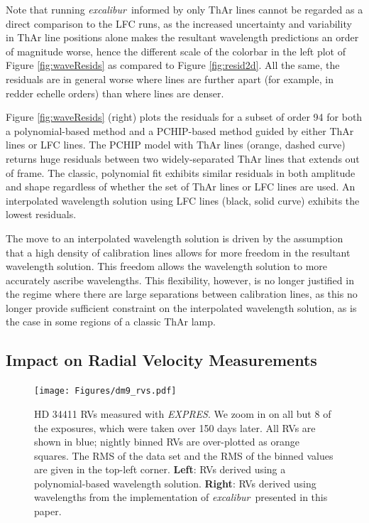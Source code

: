 \documentclass[twocolumn,table,xcolor,trackchanges]{aastex63}
\newcommand{\project}[1]{\textsl{#1}}
\newcommand{\name}{\project{excalibur}}
\newcommand{\acronym}[1]{{\small{#1}}}
\newcommand{\expres}{\project{\acronym{EXPRES}}}
\begin{document}
Note that running \name\ informed by only ThAr lines cannot be regarded as a direct comparison to the LFC runs, as the increased uncertainty and variability in ThAr line positions alone makes the resultant wavelength predictions an order of magnitude worse, hence the different scale of the colorbar in the left plot of Figure \ref{fig:waveResids} as compared to Figure \ref{fig:resid2d}.  All the same, the residuals are in general worse where lines are further apart (for example, in redder echelle orders) than where lines are denser.

Figure \ref{fig:waveResids} (right) plots the residuals for a subset of order 94 for both a polynomial-based method and a PCHIP-based method guided by either ThAr lines or LFC lines.   The PCHIP model with ThAr lines (orange, dashed curve) returns huge residuals between two widely-separated ThAr lines that extends out of frame.  The classic, polynomial fit exhibits similar residuals in both amplitude and shape regardless of whether the set of ThAr lines or LFC lines are used.  An interpolated wavelength solution using LFC lines (black, solid curve) exhibits the lowest residuals.

The move to an interpolated wavelength solution is driven by the assumption that a high density of calibration lines allows for more freedom in the resultant wavelength solution.  This freedom allows the wavelength solution to more accurately ascribe wavelengths.  This flexibility, however, is no longer justified in the regime where there are large separations between calibration lines, as this no longer provide sufficient constraint on the interpolated wavelength solution, as is the case in some regions of a classic ThAr lamp.

\subsection{Impact on Radial Velocity Measurements}\label{sec:test-rv}

\begin{figure}[t]
\centering
\texttt{[image: Figures/dm9\_rvs.pdf]}
\caption{HD 34411 RVs measured with \expres.  We zoom in on all but 8 of the exposures, which were taken over 150 days later.  All RVs are shown in blue; nightly binned RVs are over-plotted as orange squares.  The RMS of the data set and the RMS of the binned values are given in the top-left corner.  \textbf{Left}: RVs derived using a polynomial-based wavelength solution.  \textbf{Right}: RVs derived using wavelengths from the implementation of \name\ presented in this paper.}
\label{fig:rvs}
\end{figure}
\end{document}
